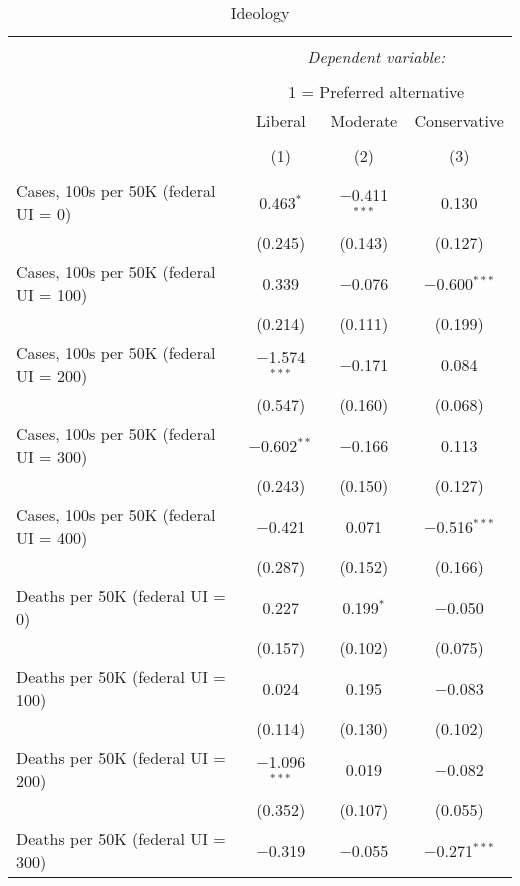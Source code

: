 
\begin{table}[!htbp] \centering \scriptsize 
  \caption{Ideology} 
  \label{} 
\begin{tabular}{@{\extracolsep{5pt}}lccc} 
\\[-1.8ex]\hline 
\hline \\[-1.8ex] 
 & \multicolumn{3}{c}{\textit{Dependent variable:}} \\ 
\cline{2-4} 
\\[-1.8ex] & \multicolumn{3}{c}{1 = Preferred alternative} \\ 
 & Liberal & Moderate & Conservative \\ 
\\[-1.8ex] & (1) & (2) & (3)\\ 
\hline \\[-1.8ex] 
 Cases, 100s per 50K (federal UI = 0) & 0.463$^{*}$ & $-$0.411$^{***}$ & 0.130 \\ 
  & (0.245) & (0.143) & (0.127) \\ 
  Cases, 100s per 50K (federal UI = 100) & 0.339 & $-$0.076 & $-$0.600$^{***}$ \\ 
  & (0.214) & (0.111) & (0.199) \\ 
  Cases, 100s per 50K (federal UI = 200) & $-$1.574$^{***}$ & $-$0.171 & 0.084 \\ 
  & (0.547) & (0.160) & (0.068) \\ 
  Cases, 100s per 50K (federal UI = 300) & $-$0.602$^{**}$ & $-$0.166 & 0.113 \\ 
  & (0.243) & (0.150) & (0.127) \\ 
  Cases, 100s per 50K (federal UI = 400) & $-$0.421 & 0.071 & $-$0.516$^{***}$ \\ 
  & (0.287) & (0.152) & (0.166) \\ 
  Deaths per 50K (federal UI = 0) & 0.227 & 0.199$^{*}$ & $-$0.050 \\ 
  & (0.157) & (0.102) & (0.075) \\ 
  Deaths per 50K (federal UI = 100) & 0.024 & 0.195 & $-$0.083 \\ 
  & (0.114) & (0.130) & (0.102) \\ 
  Deaths per 50K (federal UI = 200) & $-$1.096$^{***}$ & 0.019 & $-$0.082 \\ 
  & (0.352) & (0.107) & (0.055) \\ 
  Deaths per 50K (federal UI = 300) & $-$0.319 & $-$0.055 & $-$0.271$^{***}$ \\ 

\end{tabular}
\end{table}
